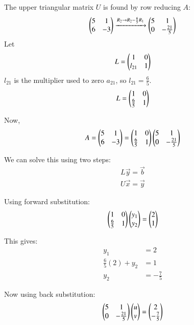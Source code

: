 \documentclass[journal]{IEEEtran}
\begin{document}
The upper triangular matrix $U$ is found by row reducing $A$:
\begin{align}
    \begin{pmatrix}5 & 1\\6 & -3\end{pmatrix} \xrightarrow{R_2 \rightarrow R_2 - \frac{6}{5}R_1} \begin{pmatrix}5 & 1\\0 & -\frac{21}{5}\end{pmatrix}
\end{align}
Let 
\begin{align}
    L = \begin{pmatrix}1 & 0\\ l_{21} & 1\end{pmatrix}
\end{align}
$l_{21}$ is the multiplier used to zero $a_{21}$, so $l_{21} = \frac{6}{5}$.\\
\newline
\begin{align}
    L = \begin{pmatrix}1 & 0\\\frac{6}{5} & 1\end{pmatrix}
\end{align}

Now,
\begin{align}
    A = \begin{pmatrix}5 & 1\\6 & -3\end{pmatrix} = \begin{pmatrix}1 & 0\\\frac{6}{5} & 1\end{pmatrix}\begin{pmatrix}5 & 1\\0 & -\frac{21}{5}\end{pmatrix}
\end{align}

We can solve this using two steps:
\begin{align}
    L\vec{y} = \vec{b}\\
    U\vec{x} = \vec{y}
\end{align}

Using forward substitution:
\begin{align}
    \begin{pmatrix}1 & 0\\\frac{6}{5} & 1\end{pmatrix}\begin{pmatrix}y_1\\y_2\end{pmatrix} = \begin{pmatrix}2\\1\end{pmatrix}
\end{align}

This gives:
\begin{align}
    y_1 &= 2\\
    \frac{6}{5}(2) + y_2 &= 1\\
    y_2 &= -\frac{7}{5}
\end{align}

Now using back substitution:
\begin{align}
    \begin{pmatrix}5 & 1\\0 & -\frac{21}{5}\end{pmatrix}\begin{pmatrix}u\\v\end{pmatrix} = \begin{pmatrix}2\\-\frac{7}{5}\end{pmatrix}
\end{align}
\end{document}
